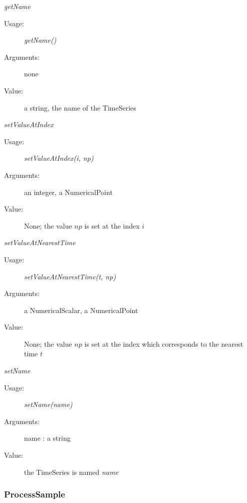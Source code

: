 \begin{description}
\begin{description}
\item \textit{getName}
\begin{description}
\item[Usage:] \textit{getName()}
\item[Arguments:] none
\item[Value:] a string, the name of the TimeSeries
\end{description}
\bigskip

\item \textit{setValueAtIndex}
\begin{description}
\item[Usage:] \textit{setValueAtIndex(i, np)}
\item[Arguments:] an integer, a NumericalPoint
\item[Value:] None; the value $np$ is set at the index $i$
\end{description}
\bigskip

\item \textit{setValueAtNearestTime}
\begin{description}
\item[Usage:] \textit{setValueAtNearestTime(t, np)}
\item[Arguments:] a NumericalScalar, a NumericalPoint
\item[Value:] None; the value $np$ is set at the index which corresponds to the nearest time $t$
\end{description}
\bigskip

\item \textit{setName}
\begin{description}
\item[Usage:] \textit{setName(name)}
\item[Arguments:] name : a string
\item[Value:] the TimeSeries is named \textit{name}
\end{description}
\bigskip



\end{description}

\end{description}



\newpage
\subsubsection{ProcessSample}

